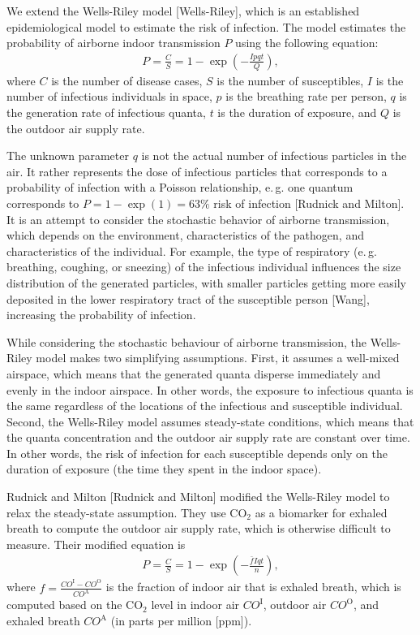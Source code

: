 \documentclass[fleqn,11pt]{wlscirep_supp}
\newcommand\eg{e.\,g.\xspace}
\begin{document}
We extend the Wells-Riley model [Wells-Riley], which is an established epidemiological model to estimate the risk of infection. The model estimates the probability of airborne indoor transmission $P$ using the following equation: 
\begin{align}
    P = \frac{C}{S} = 1 - \exp \left(-\frac{Ipqt}{Q}\right),
\end{align}
where $C$ is the number of disease cases, $S$ is the number of susceptibles, $I$ is the number of infectious individuals in space, $p$ is the breathing rate per person, $q$ is the generation rate of infectious quanta, $t$ is the duration of exposure, and $Q$ is the outdoor air supply rate. 

The unknown parameter $q$ is not the actual number of infectious particles in the air. It rather represents the dose of infectious particles that corresponds to a probability of infection with a Poisson relationship, \eg one quantum corresponds to $P = 1 - \exp (1) = 63\%$ risk of infection [Rudnick and Milton]. It is an attempt to consider the stochastic behavior of airborne transmission, which depends on the environment, characteristics of the pathogen, and characteristics of the individual. For example, the type of respiratory (\eg breathing, coughing, or sneezing) of the infectious individual influences the size distribution of the generated particles, with smaller particles getting more easily deposited in the lower respiratory tract of the susceptible person [Wang], increasing the probability of infection. 

While considering the stochastic behaviour of airborne transmission, the Wells-Riley model makes two simplifying assumptions. First, it assumes a well-mixed airspace, which means that the generated quanta disperse immediately and evenly in the indoor airspace. In other words, the exposure to infectious quanta is the same regardless of the locations of the infectious and susceptible individual. Second, the Wells-Riley model assumes steady-state conditions, which means that the quanta concentration and the outdoor air supply rate are constant over time. In other words, the risk of infection for each susceptible depends only on the duration of exposure (the time they spent in the indoor space). 

Rudnick and Milton [Rudnick and Milton] modified the Wells-Riley model to relax the steady-state assumption. They use CO$_2$ as a biomarker for exhaled breath to compute the outdoor air supply rate, which is otherwise difficult to measure. Their modified equation is
\begin{align}
    P = \frac{C}{S} = 1 - \exp \left(-\frac{\bar{f}Iqt}{n}\right),
\end{align}
where $f = \frac{CO^{\text{I}}-CO^{\text{O}}}{CO^{\text{A}}}$ is the fraction of indoor air that is exhaled breath, which is computed based on the CO$_2$ level in indoor air $CO^{\text{I}}$, outdoor air $CO^{\text{O}}$, and exhaled breath $CO^{\text{A}}$ (in parts per million [ppm]). 
\end{document}
